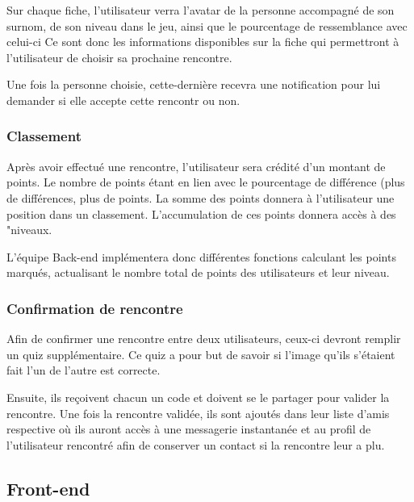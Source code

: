 \documentclass[10pt]{article}
\begin{document}
    Sur chaque fiche, l'utilisateur verra l'avatar de la personne accompagné de son surnom, de son niveau dans le jeu, ainsi que le 
    pourcentage de ressemblance avec celui-ci  
    Ce sont donc les informations disponibles sur la fiche qui permettront à l'utilisateur de choisir sa prochaine rencontre.

    Une fois la personne choisie, cette-dernière recevra une notification pour lui demander si elle accepte cette rencontr ou non.
   \subsubsection{Classement}
    Après avoir effectué une rencontre, l'utilisateur sera crédité d'un montant de points. Le nombre de points étant en lien avec le
    pourcentage de différence (plus de différences, plus de points. La somme des points donnera à l'utilisateur une position dans 
    un classement. L'accumulation de ces points donnera accès à des "niveaux.

    L'équipe Back-end implémentera donc différentes fonctions calculant les points marqués, actualisant le nombre total de points des
    utilisateurs et leur niveau.
   \subsubsection{Confirmation de rencontre}
    Afin de confirmer une rencontre entre deux utilisateurs, ceux-ci devront remplir un quiz supplémentaire. 
    Ce quiz a pour but de savoir si l'image qu'ils s'étaient fait l'un de l'autre est correcte. 

    Ensuite, ils reçoivent chacun un code et doivent se le partager pour valider la rencontre. 
    Une fois la rencontre validée, ils sont ajoutés dans leur liste d'amis respective où ils auront accès à une messagerie 
    instantanée et au profil de l'utilisateur rencontré afin de conserver un contact si la rencontre leur a plu. 
  \subsection{Front-end}
 
\end{document}
